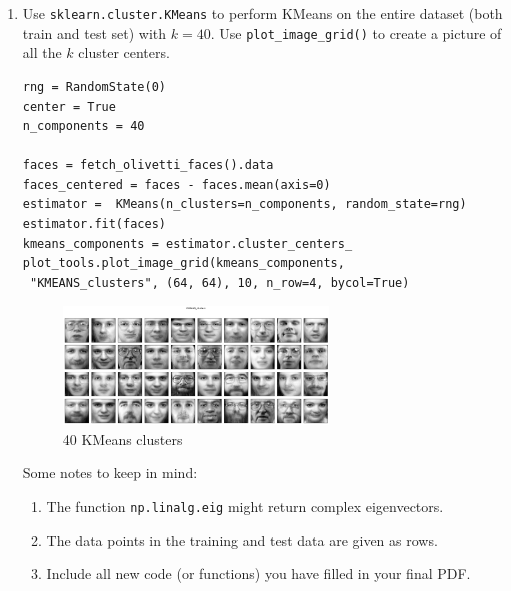 \documentclass[12pt,twoside]{article}
\begin{document}
\begin{enumerate}
\begin{enumerate}
\item Use \verb|sklearn.cluster.KMeans| to perform KMeans on the entire dataset (both train and test set) with $k=40$. Use \verb|plot_image_grid()| to create a picture of all the $k$ cluster centers. 

\begin{verbatim} 
rng = RandomState(0)
center = True
n_components = 40

faces = fetch_olivetti_faces().data
faces_centered = faces - faces.mean(axis=0)
estimator =  KMeans(n_clusters=n_components, random_state=rng)
estimator.fit(faces)
kmeans_components = estimator.cluster_centers_
plot_tools.plot_image_grid(kmeans_components,
 "KMEANS_clusters", (64, 64), 10, n_row=4, bycol=True)
\end{verbatim}

	\begin{figure}[H]
		\centering
		\includegraphics[width=200pt]{figures/KMEANS_clusters}
		\caption{40 KMeans clusters}
		\label{fig9}
	\end{figure}
	


 Some notes to keep in mind:
  \begin{enumerate}
  \item The function {\tt np.linalg.eig} might return complex eigenvectors.
  \item The data points in the training and test data are given as
    rows.
    \item Include all new code (or functions) you have filled in your final PDF.
 \end{enumerate}
 


	\end{enumerate}
  
\end{enumerate}
\end{document}
